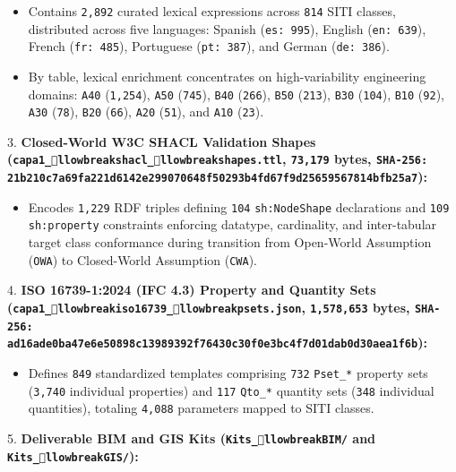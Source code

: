 \documentclass[10pt,a4paper]{article}
\begin{document}
\begin{itemize}
  \item Contains \texttt{2,892} curated lexical expressions across \texttt{814} SITI classes, distributed across five languages: Spanish (\texttt{es: 995}), English (\texttt{en: 639}), French (\texttt{fr: 485}), Portuguese (\texttt{pt: 387}), and German (\texttt{de: 386}).
  \item By table, lexical enrichment concentrates on high-variability engineering domains: \texttt{A40} (\texttt{1,254}), \texttt{A50} (\texttt{745}), \texttt{B40} (\texttt{266}), \texttt{B50} (\texttt{213}), \texttt{B30} (\texttt{104}), \texttt{B10} (\texttt{92}), \texttt{A30} (\texttt{78}), \texttt{B20} (\texttt{66}), \texttt{A20} (\texttt{51}), and \texttt{A10} (\texttt{23}).
\end{itemize}
3. \textbf{Closed-World W3C SHACL Validation Shapes (\texttt{capa1\_llowbreak{}shacl\_llowbreak{}shapes.ttl}, \texttt{73,179} bytes, \texttt{SHA-256: 21b210c7a69fa221d6142e299070648f50293b4fd67f9d25659567814bfb25a7}):}\par
\begin{itemize}
  \item Encodes \texttt{1,229} RDF triples defining \texttt{104} \texttt{sh:NodeShape} declarations and \texttt{109} \texttt{sh:property} constraints enforcing datatype, cardinality, and inter-tabular target class conformance during transition from Open-World Assumption (\texttt{OWA}) to Closed-World Assumption (\texttt{CWA}).
\end{itemize}
4. \textbf{ISO 16739-1:2024 (IFC 4.3) Property and Quantity Sets (\texttt{capa1\_llowbreak{}iso16739\_llowbreak{}psets.json}, \texttt{1,578,653} bytes, \texttt{SHA-256: ad16ade0ba47e6e50898c13989392f76430c30f0e3bc4f7d01dab0d30aea1f6b}):}\par
\begin{itemize}
  \item Defines \texttt{849} standardized templates comprising \texttt{732} \texttt{Pset\_*} property sets (\texttt{3,740} individual properties) and \texttt{117} \texttt{Qto\_*} quantity sets (\texttt{348} individual quantities), totaling \texttt{4,088} parameters mapped to SITI classes.
\end{itemize}
5. \textbf{Deliverable BIM and GIS Kits (\texttt{Kits\_llowbreak{}BIM/} and \texttt{Kits\_llowbreak{}GIS/}):}\par
\end{document}
